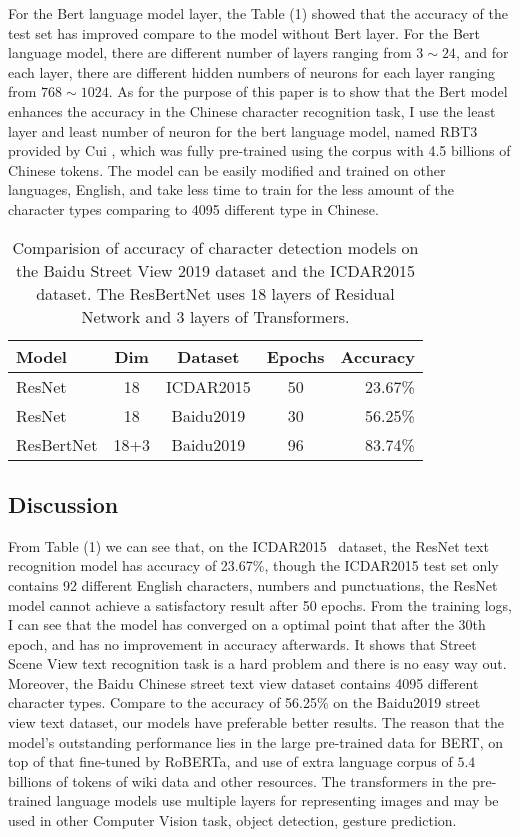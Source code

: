 \documentclass[10pt,twocolumn,letterpaper]{article}
\begin{document}
For the Bert language model layer, the Table (1) showed that the accuracy of the test set has improved compare to the model without Bert layer.
For the Bert language model, there are different number of layers ranging from $3\sim24$, and for each layer,
there are different hidden numbers of neurons for each layer ranging from $768\sim1024$.
As for the purpose of this paper is to show that the Bert model enhances the accuracy in the Chinese character recognition task,
I use the least layer and least number of neuron for the bert language model, named RBT3 provided by Cui \etal,
which was fully pre-trained using the corpus with 4.5 billions of Chinese tokens.
The model can be easily modified and trained on other languages, \eg English,
and take less time to train for the less amount of the character types comparing to
4095 different type in Chinese.


\begin{table}
\begin{center}
\begin{tabular}{|l|c|c|c|r|}
\hline
Model & Dim & Dataset& Epochs & Accuracy \\
\hline\hline
ResNet      & 18 &  ICDAR2015     & 50 &	23.67\% \\
ResNet      & 18 &  Baidu2019	  & 30 &	56.25\% \\
ResBertNet  & 18+3 & Baidu2019    & 96	&	83.74\% \\
\hline
\end{tabular}
\end{center}
\caption{Comparision of accuracy of character detection models on the Baidu Street View 2019 dataset and the ICDAR2015 dataset.
The ResBertNet uses 18 layers of Residual Network and 3 layers of Transformers.}
\end{table}


\subsection{Discussion}

From Table (1) we can see that, on the ICDAR2015~\cite{karatzas2015icdar} dataset, the ResNet text recognition model has accuracy of 23.67\%,
though the ICDAR2015 test set only contains 92 different English characters, numbers and punctuations,
the ResNet model cannot achieve a satisfactory result after 50 epochs.
From the training logs, I can see that the model has converged on a optimal point that after the 30th epoch,
and has no improvement in accuracy afterwards.
It shows that Street Scene View text recognition task is a hard problem and there is no easy way out.
Moreover, the Baidu Chinese street text view dataset contains 4095 different character types.
Compare to the accuracy of 56.25\% on the Baidu2019 street view text dataset, our models have preferable better results.
The reason that the model's outstanding performance lies in the large pre-trained data for BERT, on top of that fine-tuned by RoBERTa, and use of extra language corpus of
$5.4$ billions of tokens of wiki data and other resources.
The transformers in the pre-trained language models use multiple layers for representing images and may be used in other Computer Vision task, \eg object detection, gesture prediction.
\end{document}
